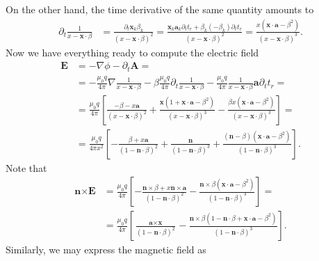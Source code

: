 \documentclass[english, parskip=full]{scrartcl}
\newcommand{\kla}{}
\newcommand{\klam}{}
\begin{document}
On the other hand, the time derivative of the same quantity amounts to
\begin{align}
\partial_t \frac{1}{x - \textbf{x} \cdot \beta} &= \frac{\partial_t \textbf{x}_k \beta_k }{\kla\left( x - \textbf{x}\cdot\beta \right)^2} =  \frac{\textbf{x}_k \textbf{a}_k \partial_t t_r + \beta_k (-\beta_k)\partial_tt_r}{\kla\left( x - \textbf{x}\cdot\beta \right)^2}  =  \frac{x \kla\left( \textbf{x}\cdot\textbf{a} - \beta^2 \right)}{\kla\left( x - \textbf{x}\cdot\beta \right)^3}. \label{eqn:LW partial t 1 over x}
\end{align}
Now we have everything ready to compute the electric field
\begin{align}
\textbf{E} &= -\nabla\phi - \partial_t \textbf{A} = \\
&= -\frac{\mu_0 q}{4\pi} \nabla\frac{1}{x - \textbf{x}\cdot \beta} - \beta \frac{\mu_0 q}{4\pi} \partial_t\frac{1}{x - \textbf{x}\cdot \beta} - \frac{\mu_0 q}{4\pi} \frac{1}{x - \textbf{x}\cdot \beta} \textbf{a} \partial_t t_r = \\
&= \frac{\mu_0 q}{4\pi} \klam\left[ \frac{-\beta - x\textbf{a}}{(x - \textbf{x}\cdot \beta)^2} + \frac{\textbf{x}\kla\left( 1 + \textbf{x}\cdot\textbf{a} - \beta^2 \right)}{(x - \textbf{x}\cdot \beta)^3} - \frac{\beta x \kla\left( \textbf{x}\cdot\textbf{a} - \beta^2 \right)}{(x - \textbf{x}\cdot \beta)^3} \right] = \\
&= \frac{\mu_0 q}{4\pi x^2} \klam\left[ -\frac{\beta + x\textbf{a}}{(1 - \textbf{n} \cdot \beta)^2} + \frac{\textbf{n}}{(1 - \textbf{n}\cdot \beta)^3} + \frac{ (\textbf{n} - \beta)\kla\left( \textbf{x}\cdot\textbf{a} - \beta^2 \right)}{(1 - \textbf{n}\cdot \beta)^3} \right].
\end{align}
Note that
\begin{align}
\textbf{n} \times \textbf{E} &= \frac{\mu_0 q}{4\pi} \klam\left[ -\frac{\textbf{n} \times \beta + x\textbf{n} \times \textbf{a}}{(1 - \textbf{n}\cdot \beta)^2} - \frac{\textbf{n}\times \beta \kla\left( \textbf{x}\cdot \textbf{a} - \beta^2 \right)}{(1 - \textbf{n}\cdot \beta)^3} \right] = \\
&= \frac{\mu_0 q}{4\pi} \klam\left[ \frac{\textbf{a}\times \textbf{x}}{(1 - \textbf{n}\cdot \beta)^2} - \frac{\textbf{n}\times\beta \kla\left( 1 - \textbf{n}\cdot\beta + \textbf{x}\cdot \textbf{a} - \beta^2 \right)}{(1 - \textbf{n}\cdot \beta)^3} \right].
\end{align}
Similarly, we may express the magnetic field as
\end{document}
